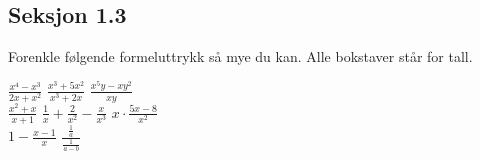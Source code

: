 \documentclass[a4paper,11pt]{article}
\begin{document}
\subsection*{Seksjon 1.3}


\begin{problem}[1]
  Forenkle følgende formeluttrykk så mye du kan. Alle bokstaver 
  står for tall.
  \begin{tabenum}%
    \tabenumitem $\displaystyle \frac{x^4 - x^3}{2x + x^2}$
    \hypertarget{subproblem:1.3-1a-MAT-0001-2019-V}{}
    \tabenumitem $\displaystyle \frac{x^3 + 5x^2}{x^3 + 2x}$
    \hypertarget{subproblem:1.3-1b-MAT-0001-2019-V}{}
    \tabenumitem $\displaystyle \frac{x^5 y - x y^2}{xy}$
    \hypertarget{subproblem:1.3-1c-MAT-0001-2019-V}{}
    \\
    \tabenumitem $\displaystyle \frac{x^2 + x}{x + 1}$
    \hypertarget{subproblem:1.3-1d-MAT-0001-2019-V}{}
    \tabenumitem $\displaystyle \frac{1}{x} + \frac{2}{x^2} - \frac{x}{x^3}$
    \hypertarget{subproblem:1.3-1e-MAT-0001-2019-V}{}
    \tabenumitem $\displaystyle x \cdot \frac{5x - 8}{x^2}$
    \hypertarget{subproblem:1.3-1f-MAT-0001-2019-V}{}
    \\
    \tabenumitem $\displaystyle 1 - \frac{x - 1}{x}$
    \hypertarget{subproblem:1.3-1g-MAT-0001-2019-V}{}
    \tabenumitem $\displaystyle \frac{\frac{1}{a}}{\frac{1}{a-b}}$
    \hypertarget{subproblem:1.3-1h-MAT-0001-2019-V}{}
  \end{tabenum}
\end{problem}
\end{document}
